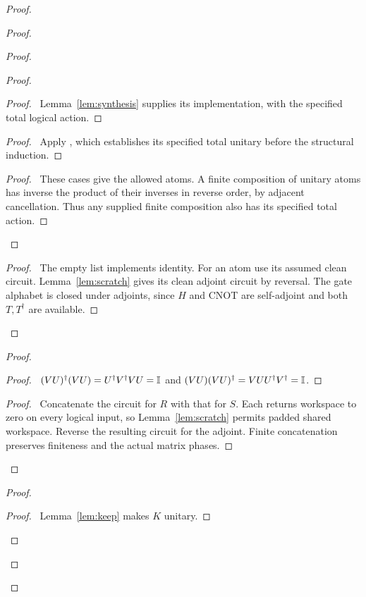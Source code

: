 \begin{proof}
\begin{proof}
\begin{proof}
\begin{proof}
 \begin{proof}\pf\ Lemma~\ref{lem:synthesis} supplies its
 implementation, with the specified total logical action.\end{proof}
 \begin{proof}\pf\ Apply , which establishes
 its specified total unitary before the structural induction.\end{proof}
 \qedstep
 \begin{proof}\pf\ These cases give the allowed atoms. A finite
 composition of unitary atoms has inverse the product of their
 inverses in reverse order, by adjacent cancellation. Thus any
 supplied finite composition also has its specified total action.
 \end{proof}
\end{proof}
   \qedstep
   \begin{proof}\pf\ The empty list implements identity. For an atom
   use its assumed clean circuit. Lemma~\ref{lem:scratch} gives its
   clean adjoint circuit by reversal. The gate alphabet is closed under
   adjoints, since $H$ and CNOT are self-adjoint and both $T,T^\dagger$
   are available.
   \end{proof}
  \end{proof}
  \begin{proof}
   \begin{proof}\pf\ $(VU)^\dagger(VU)=U^\dagger V^\dagger VU=\mathbb{I}$
   and $(VU)(VU)^\dagger=VUU^\dagger V^\dagger=\mathbb{I}$.
   \end{proof}
   \qedstep
   \begin{proof}\pf\ Concatenate the circuit for $R$ with that for
   $S$. Each returns workspace to zero on every logical input, so
   Lemma~\ref{lem:scratch} permits padded shared workspace. Reverse
   the resulting circuit for the adjoint. Finite concatenation preserves
   finiteness and the actual matrix phases.
   \end{proof}
  \end{proof}
  \begin{proof}
   \begin{proof}\pf\ Lemma~\ref{lem:keep} makes $K$ unitary.

\end{proof}
\end{proof}
\end{proof}
\end{proof}
